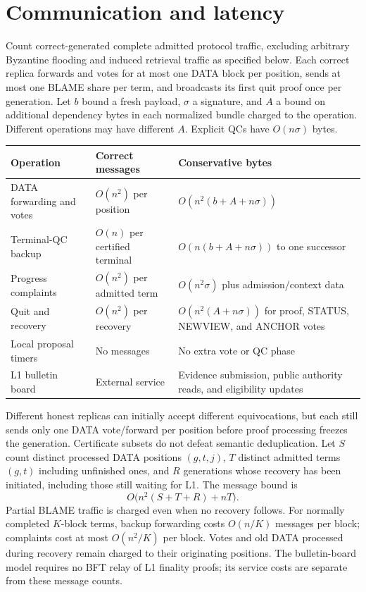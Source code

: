 \documentclass[11pt,a4paper]{article}
\newcounter{protocol}
\begin{document}
\section{Communication and latency}
\label{sec:complexity}
Count correct-generated complete admitted protocol traffic, excluding
arbitrary Byzantine flooding and induced retrieval traffic as specified below.
Each correct replica forwards and votes for at most one DATA
block per position, sends at most one BLAME share per term, and broadcasts
its first quit proof once per generation. Let $b$ bound a fresh payload,
$\sigma$ a signature, and $A$ a bound on additional dependency bytes in
each normalized bundle charged to the operation. Different operations may
have different $A$. Explicit QCs have $O(n\sigma)$ bytes.

\begin{center}\small
\begin{tabularx}{\linewidth}{@{}>{\raggedright\arraybackslash}p{.24\linewidth}
 >{\raggedright\arraybackslash}p{.20\linewidth}Y@{}}
\toprule
Operation & Correct messages & Conservative bytes\\
\midrule
DATA forwarding and votes & $O(n^2)$ per position &
$O(n^2(b+A+n\sigma))$\\
Terminal-QC backup & $O(n)$ per certified terminal &
$O(n(b+A+n\sigma))$ to one successor\\
Progress complaints & $O(n^2)$ per admitted term &
$O(n^2\sigma)$ plus admission/context data\\
Quit and recovery & $O(n^2)$ per recovery &
$O(n^2(A+n\sigma))$ for proof, STATUS, NEWVIEW, and ANCHOR votes\\
Local proposal timers & No messages & No extra vote or QC phase\\
L1 bulletin board & External service & Evidence submission, public authority
reads, and eligibility updates\\
\bottomrule
\end{tabularx}
\end{center}
Different honest replicas can initially accept different equivocations,
but each still sends only one DATA vote/forward per position before proof
processing freezes the generation. Certificate subsets do not defeat
semantic deduplication. Let $S$ count distinct processed DATA positions
$(g,t,j)$, $T$ distinct admitted terms $(g,t)$ including unfinished ones,
and $R$ generations whose recovery has been initiated, including those
still waiting for L1. The message bound is
\[
 O\bigl(n^2(S+T+R)+nT\bigr).
\]
Partial BLAME traffic is charged even when no recovery follows. For
normally completed $K$-block terms, backup forwarding costs $O(n/K)$
messages per block; complaints cost at most $O(n^2/K)$ per block.
Votes and old DATA processed during recovery remain charged to their
originating positions. The bulletin-board model requires no BFT relay of
L1 finality proofs; its service costs are separate from these message counts.
\end{document}
